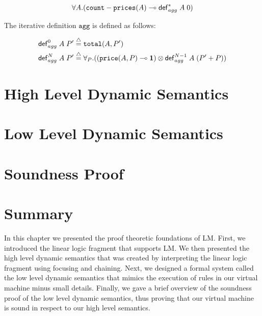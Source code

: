 \begin{align}
\forall A. (\mathtt{count-prices}(A) \multimap \mathsf{def}_{agg}^{*} \; A \; 0)
\end{align}

The iterative definition $\mathtt{agg}$ is defined as follows:

\begin{align}
\iterz{agg}{0} A \; P' & \defeq \mathtt{total}(A, P') \\
\iterz{agg}{N} A \; P' & \defeq \forall_P. ((\mathtt{price}(A, P) \lolli \one)
      \otimes \iterz{agg}{N-1} A \; (P' + P))
\end{align}

\section{High Level Dynamic Semantics}



\section{Low Level Dynamic Semantics}

\section{Soundness Proof}

\section{Summary}

In this chapter we presented the proof theoretic foundations of LM.
First, we introduced the linear logic fragment that supports LM. We then presented the
high level dynamic semantics that was created by interpreting the linear logic fragment using
focusing and chaining. Next, we designed
a formal system called the low level dynamic semantics that mimics the execution of rules in
our virtual machine minus small details.
Finally, we gave a brief overview of the soundness proof of the low level dynamic semantics,
thus proving that our virtual machine is sound in respect to our high level semantics.

